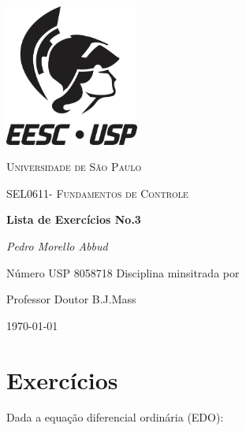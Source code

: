 \documentclass[12pt,a4paper]{article}
\begin{document}
\begin{titlepage}
  \centering
  \includegraphics[width=0.33\textwidth]{usp}\par\vspace{1cm}
  {\scshape\LARGE Universidade de São Paulo\par}
  \vspace{1cm}
  {\scshape\Large SEL0611- Fundamentos de Controle\par}
  \vspace{1.5cm}
  {\huge\bfseries Lista de Exercícios No.3\par}
  \vspace{2cm}
  {\Large\itshape Pedro Morello Abbud \par}
  \vspace{1cm}
  Número USP 8058718
  \vfill
  Disciplina minsitrada por\par
  Professor Doutor B.J.Mass

  \vfill 
  {\large \today\par}
\end{titlepage}
\newpage
\section*{Exercícios}
Dada a equação diferencial ordinária (EDO):
\end{document}
